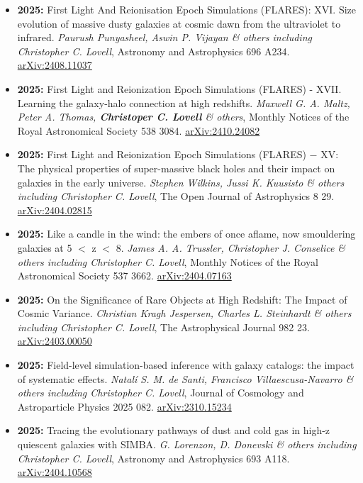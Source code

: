 \begin{itemize}
\item \textbf{2025:} First Light And Reionisation Epoch Simulations (FLARES): XVI. Size evolution of massive dusty galaxies at cosmic dawn from the ultraviolet to infrared. \textit{Paurush Punyasheel, Aswin P. Vijayan \& others including Christopher C. Lovell}, Astronomy and Astrophysics 696 A234. \href{https://arxiv.org/abs/2408.11037}{arXiv:2408.11037}
\item \textbf{2025:} First Light and Reionization Epoch Simulations (FLARES) - XVII. Learning the galaxy-halo connection at high redshifts. \textit{Maxwell G. A. Maltz, Peter A. Thomas, \textbf{Christoper C. Lovell} \& others}, Monthly Notices of the Royal Astronomical Society 538 3084. \href{https://arxiv.org/abs/2410.24082}{arXiv:2410.24082}
\item \textbf{2025:} First Light and Reionization Epoch Simulations (FLARES) $-$ XV: The physical properties of super-massive black holes and their impact on galaxies in the early universe. \textit{Stephen Wilkins, Jussi K. Kuusisto \& others including Christopher C. Lovell}, The Open Journal of Astrophysics 8 29. \href{https://arxiv.org/abs/2404.02815}{arXiv:2404.02815}
\item \textbf{2025:} Like a candle in the wind: the embers of once aflame, now smouldering galaxies at 5 $<$ z $<$ 8. \textit{James A. A. Trussler, Christopher J. Conselice \& others including Christopher C. Lovell}, Monthly Notices of the Royal Astronomical Society 537 3662. \href{https://arxiv.org/abs/2404.07163}{arXiv:2404.07163}
\item \textbf{2025:} On the Significance of Rare Objects at High Redshift: The Impact of Cosmic Variance. \textit{Christian Kragh Jespersen, Charles L. Steinhardt \& others including Christopher C. Lovell}, The Astrophysical Journal 982 23. \href{https://arxiv.org/abs/2403.00050}{arXiv:2403.00050}
\item \textbf{2025:} Field-level simulation-based inference with galaxy catalogs: the impact of systematic effects. \textit{Natalí S. M. de Santi, Francisco Villaescusa-Navarro \& others including Christopher C. Lovell}, Journal of Cosmology and Astroparticle Physics 2025 082. \href{https://arxiv.org/abs/2310.15234}{arXiv:2310.15234}
\item \textbf{2025:} Tracing the evolutionary pathways of dust and cold gas in high-z quiescent galaxies with SIMBA. \textit{G. Lorenzon, D. Donevski \& others including Christopher C. Lovell}, Astronomy and Astrophysics 693 A118. \href{https://arxiv.org/abs/2404.10568}{arXiv:2404.10568}

\end{itemize}
